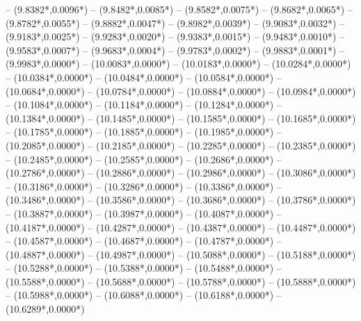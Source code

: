 {	-- ({9.8382*\dx},{0.0096*\dy})
	-- ({9.8482*\dx},{0.0085*\dy})
	-- ({9.8582*\dx},{0.0075*\dy})
	-- ({9.8682*\dx},{0.0065*\dy})
	-- ({9.8782*\dx},{0.0055*\dy})
	-- ({9.8882*\dx},{0.0047*\dy})
	-- ({9.8982*\dx},{0.0039*\dy})
	-- ({9.9083*\dx},{0.0032*\dy})
	-- ({9.9183*\dx},{0.0025*\dy})
	-- ({9.9283*\dx},{0.0020*\dy})
	-- ({9.9383*\dx},{0.0015*\dy})
	-- ({9.9483*\dx},{0.0010*\dy})
	-- ({9.9583*\dx},{0.0007*\dy})
	-- ({9.9683*\dx},{0.0004*\dy})
	-- ({9.9783*\dx},{0.0002*\dy})
	-- ({9.9883*\dx},{0.0001*\dy})
	-- ({9.9983*\dx},{0.0000*\dy})
	-- ({10.0083*\dx},{0.0000*\dy})
	-- ({10.0183*\dx},{0.0000*\dy})
	-- ({10.0284*\dx},{0.0000*\dy})
	-- ({10.0384*\dx},{0.0000*\dy})
	-- ({10.0484*\dx},{0.0000*\dy})
	-- ({10.0584*\dx},{0.0000*\dy})
	-- ({10.0684*\dx},{0.0000*\dy})
	-- ({10.0784*\dx},{0.0000*\dy})
	-- ({10.0884*\dx},{0.0000*\dy})
	-- ({10.0984*\dx},{0.0000*\dy})
	-- ({10.1084*\dx},{0.0000*\dy})
	-- ({10.1184*\dx},{0.0000*\dy})
	-- ({10.1284*\dx},{0.0000*\dy})
	-- ({10.1384*\dx},{0.0000*\dy})
	-- ({10.1485*\dx},{0.0000*\dy})
	-- ({10.1585*\dx},{0.0000*\dy})
	-- ({10.1685*\dx},{0.0000*\dy})
	-- ({10.1785*\dx},{0.0000*\dy})
	-- ({10.1885*\dx},{0.0000*\dy})
	-- ({10.1985*\dx},{0.0000*\dy})
	-- ({10.2085*\dx},{0.0000*\dy})
	-- ({10.2185*\dx},{0.0000*\dy})
	-- ({10.2285*\dx},{0.0000*\dy})
	-- ({10.2385*\dx},{0.0000*\dy})
	-- ({10.2485*\dx},{0.0000*\dy})
	-- ({10.2585*\dx},{0.0000*\dy})
	-- ({10.2686*\dx},{0.0000*\dy})
	-- ({10.2786*\dx},{0.0000*\dy})
	-- ({10.2886*\dx},{0.0000*\dy})
	-- ({10.2986*\dx},{0.0000*\dy})
	-- ({10.3086*\dx},{0.0000*\dy})
	-- ({10.3186*\dx},{0.0000*\dy})
	-- ({10.3286*\dx},{0.0000*\dy})
	-- ({10.3386*\dx},{0.0000*\dy})
	-- ({10.3486*\dx},{0.0000*\dy})
	-- ({10.3586*\dx},{0.0000*\dy})
	-- ({10.3686*\dx},{0.0000*\dy})
	-- ({10.3786*\dx},{0.0000*\dy})
	-- ({10.3887*\dx},{0.0000*\dy})
	-- ({10.3987*\dx},{0.0000*\dy})
	-- ({10.4087*\dx},{0.0000*\dy})
	-- ({10.4187*\dx},{0.0000*\dy})
	-- ({10.4287*\dx},{0.0000*\dy})
	-- ({10.4387*\dx},{0.0000*\dy})
	-- ({10.4487*\dx},{0.0000*\dy})
	-- ({10.4587*\dx},{0.0000*\dy})
	-- ({10.4687*\dx},{0.0000*\dy})
	-- ({10.4787*\dx},{0.0000*\dy})
	-- ({10.4887*\dx},{0.0000*\dy})
	-- ({10.4987*\dx},{0.0000*\dy})
	-- ({10.5088*\dx},{0.0000*\dy})
	-- ({10.5188*\dx},{0.0000*\dy})
	-- ({10.5288*\dx},{0.0000*\dy})
	-- ({10.5388*\dx},{0.0000*\dy})
	-- ({10.5488*\dx},{0.0000*\dy})
	-- ({10.5588*\dx},{0.0000*\dy})
	-- ({10.5688*\dx},{0.0000*\dy})
	-- ({10.5788*\dx},{0.0000*\dy})
	-- ({10.5888*\dx},{0.0000*\dy})
	-- ({10.5988*\dx},{0.0000*\dy})
	-- ({10.6088*\dx},{0.0000*\dy})
	-- ({10.6188*\dx},{0.0000*\dy})
	-- ({10.6289*\dx},{0.0000*\dy})
}
